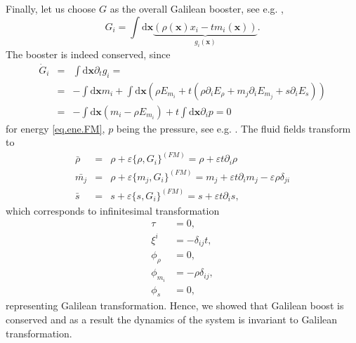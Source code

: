 \documentclass[
10pt, %
a4paper, %
oneside, %
headinclude,footinclude, %
BCOR5mm, %
]{scrartcl}
\newcommand{\xx}{\mathbf{x}}
\newcommand{\dx}{\mathrm{d}\xx}
\newcommand{\eps}{\varepsilon}
\newcommand{\MP}[1]{{\color{OliveGreen}MP:\ \ #1}}
\newcommand{\IP}[1]{{\color{Red}IP:\ \ #1}}
\newcommand{\Gfunc}{G}
\begin{document}
Finally, let us choose $\Gfunc$ as the overall Galilean booster, see e.g. 
\cite{extra-mass-flux}, 
\begin{equation}\label{eq.booster}
    \Gfunc_i = \int\dx \underbrace{(\rho(\xx) x_i - t 
    m_i(\xx))}_{g_i(\xx)}.
\end{equation}
The booster is indeed conserved, since
\begin{eqnarray}
\dot{\Gfunc}_i &=& \int \dx \partial_t g_i= \nonumber\\
&=& -\int\dx m_i+ \int\dx \left(\rho E_{m_i} + t(\rho\partial_i E_\rho +m_j \partial_i E_{m_j} +s\partial_i E_s)\right)\nonumber\\
&=& -\int\dx (m_i - \rho E_{m_i}) + t \int\dx \partial_i p = 0
\end{eqnarray}
for energy \eqref{eq.ene.FM}, $p$ being the pressure, see e.g. \cite{PKG}.
The fluid fields transform to 
\begin{subequations}
\begin{eqnarray}
    \bar{\rho} &=& \rho +\eps\{\rho,\Gfunc_i\}^{(FM)} = \rho +\eps 
    t\partial_i \rho\\
    \bar{m_j} &=& \rho +\eps\{m_j,\Gfunc_i\}^{(FM)} = m_j + \eps 
    t\partial_i m_j - \eps \rho \delta_{ji}\\
    \bar{s} &=& s +\eps\{s,\Gfunc_i\}^{(FM)} = s +\eps t\partial_i s,
\end{eqnarray}
\end{subequations}
which corresponds to infinitesimal transformation
\begin{eqnarray}
    \tau&=0,\\
    \xi^i&=-\delta_{ij} t,\\
    \phi_\rho &= 0,\\
    \phi_{m_i} &= -\rho \delta_{ij},\\
    \phi_s &=0,
\end{eqnarray}
representing Galilean transformation. Hence, we showed that Galilean boost is conserved and as a 
result the dynamics of the system is invariant to Galilean transformation.
\end{document}
